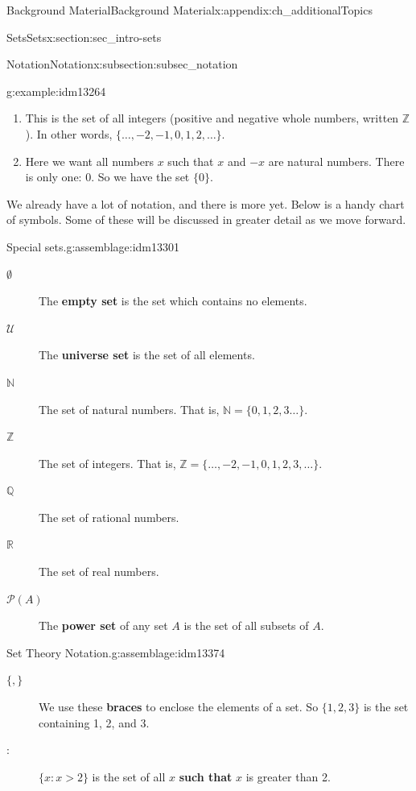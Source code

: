 \documentclass[oneside,10pt,]{book}
\newcommand{\terminology}[1]{\textbf{#1}}
\numberwithin{equation}{chapter}
\def\N{\mathbb N}
\def\Z{\mathbb Z}
\def\Q{\mathbb Q}
\def\R{\mathbb R}
\def\U{\mathcal U}
\def\pow{\mathcal P}
\def\st{:}
\begin{document}
\begin{appendixptx}{Background Material}{}{Background Material}{}{}{x:appendix:ch_additionalTopics}
\begin{sectionptx}{Sets}{}{Sets}{}{}{x:section:sec_intro-sets}
\begin{subsectionptx}{Notation}{}{Notation}{}{}{x:subsection:subsec_notation}
\begin{example}{}{g:example:idm13264}
\begin{enumerate}
\item{}This is the set of all integers  (positive and negative whole numbers, written \(\Z\)). In other words, \(\{\ldots, -2, -1, 0, 1, 2, \ldots\}\).%
\item{}Here we want all numbers \(x\) such that \(x\) and \(-x\) are natural numbers. There is only one: 0. So we have the set \(\{0\}\).%
\end{enumerate}
%
\end{example}
We already have a lot of notation, and there is more yet. Below is a handy chart of symbols. Some of these will be discussed in greater detail as we move forward.%
\begin{assemblage}{Special sets.}{g:assemblage:idm13301}%
%
\begin{description}
\item[{\(\emptyset\)}]The \terminology{empty set} is the set which contains no elements. \label{g:notation:idm13310}  %
\item[{\(\U\)}]The \terminology{universe set} is the set of all elements. \label{g:notation:idm13320}%
\item[{\(\N\)}]The set of natural numbers. That is, \(\N =
\{0, 1, 2, 3\ldots\}\).\label{g:notation:idm13328} %
\item[{\(\Z\)}]The set of integers. That is, \(\Z = \{\ldots, -2, -1, 0, 1, 2, 3, \ldots\}\).  \label{g:notation:idm13340}%
\item[{\(\Q\)}]The set of rational numbers.  \label{g:notation:idm13347} %
\item[{\(\R\)}]The set of real numbers.      \label{g:notation:idm13358}%
\item[{\(\pow(A)\)}]The \terminology{power set} of any set \(A\) is the set of all subsets of \(A\).\label{g:notation:idm13370}%
\end{description}
%
\end{assemblage}
\begin{assemblage}{Set Theory Notation.}{g:assemblage:idm13374}%
%
\begin{description}
\item[{\(\{, \}\)}]We use these \terminology{braces} to enclose the elements of a set. So \(\{1,2,3\}\) is the set containing 1, 2, and 3.\label{g:notation:idm13384}%
\item[{\(\st\)}]\(\{x \st x > 2\}\) is the set of all \(x\) \terminology{such that} \(x\) is greater than 2.\label{g:notation:idm13395}%

\end{description}
\end{assemblage}
\end{subsectionptx}
\end{sectionptx}
\end{appendixptx}
\end{document}
